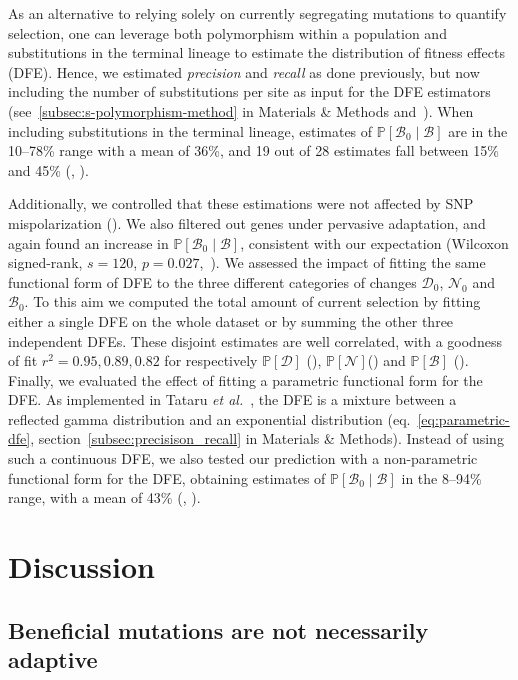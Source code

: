 \documentclass[10pt,letterpaper]{article}
\newcommand{\proba}{\mathbb{P}}
\newcommand{\SphyDel}{\mathcal{D}_0}
\newcommand{\SphyNeu}{\mathcal{N}_0}
\newcommand{\SphyBen}{\mathcal{B}_0}
\newcommand{\given}{\mid}
\newcommand{\SpopDel}{\mathcal{D}}
\newcommand{\SpopNeu}{\mathcal{N}}
\newcommand{\SpopBen}{\mathcal{B}}
\begin{document}
As an alternative to relying solely on currently segregating mutations to quantify selection, one can leverage both polymorphism within a population and substitutions in the terminal lineage to estimate the distribution of fitness effects (DFE).
Hence, we estimated \textit{precision} and \textit{recall} as done previously, but now including the number of substitutions per site as input for the DFE estimators (see~\ref{subsec:s-polymorphism-method} in Materials \& Methods and~).
When including substitutions in the terminal lineage, estimates of $\proba [ \SphyBen \given \SpopBen]$ are in the 10--78\% range with a mean of 36\%, and 19 out of 28 estimates fall between 15\% and 45\% (, ).

Additionally, we controlled that these estimations were not affected by SNP mispolarization ().
We also filtered out genes under pervasive adaptation, and again found an increase in $\proba [ \SphyBen \given \SpopBen]$, consistent with our expectation (Wilcoxon signed-rank, $s=120$, $p=0.027$,~).
We assessed the impact of fitting the same functional form of DFE to the three different categories of changes $\SphyDel$, $\SphyNeu$ and $\SphyBen$.
To this aim we computed the total amount of current selection by fitting either a single DFE on the whole dataset or by summing the other three independent DFEs.
These disjoint estimates are well correlated, with a goodness of fit $r^2={0.95, 0.89, 0.82}$ for respectively $\proba [\SpopDel]$ (), $\proba [\SpopNeu]$() and $\proba [\SpopBen]$ ().
Finally, we evaluated the effect of fitting a parametric functional form for the DFE.
As implemented in Tataru \textit{et al.}~\cite{tataru_inference_2017}, the DFE is a mixture between a reflected gamma distribution and an exponential distribution (eq.~\ref{eq:parametric-dfe}, section~\ref{subsec:precisison_recall} in Materials \& Methods).
Instead of using such a continuous DFE, we also tested our prediction with a non-parametric functional form for the DFE, obtaining estimates of $\proba [ \SphyBen \given \SpopBen]$ in the 8--94\% range, with a mean of 43\% (, ).

\section*{Discussion}
\subsection*{Beneficial mutations are not necessarily adaptive}
\end{document}
